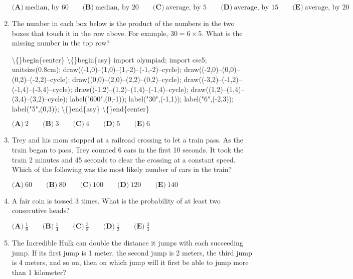 \documentclass{article}
\begin{document}
\begin{enumerate}[label=\arabic*., itemsep=0.5em]
\(\textbf{(A)}\ \text{median, by 60} \qquad \textbf{(B)}\ \text{median, by 20} \qquad \textbf{(C)}\ \text{average, by 5} \qquad \textbf{(D)}\ \text{average, by 15} \qquad \textbf{(E)}\ \text{average, by 20}\)\par \vspace{0.5em}\item The number in each box below is the product of the numbers in the two boxes that touch it in the row above. For example, \(30 = 6\times5\). What is the missing number in the top row?


\textbackslash\{\}begin\{center\}
\textbackslash\{\}begin\{asy\}
import olympiad;
import cse5;
unitsize(0.8cm);
draw((-1,0)--(1,0)--(1,-2)--(-1,-2)--cycle);
draw((-2,0)--(0,0)--(0,2)--(-2,2)--cycle);
draw((0,0)--(2,0)--(2,2)--(0,2)--cycle);
draw((-3,2)--(-1,2)--(-1,4)--(-3,4)--cycle);
draw((-1,2)--(1,2)--(1,4)--(-1,4)--cycle);
draw((1,2)--(1,4)--(3,4)--(3,2)--cycle);
label("600",(0,-1));
label("30",(-1,1));
label("6",(-2,3));
label("5",(0,3));
\textbackslash\{\}end\{asy\}
\textbackslash\{\}end\{center\}


\(\textbf{(A)}\ 2 \qquad \textbf{(B)}\ 3 \qquad \textbf{(C)}\ 4 \qquad \textbf{(D)}\ 5 \qquad \textbf{(E)}\ 6\)\par \vspace{0.5em}\item Trey and his mom stopped at a railroad crossing to let a train pass. As the train began to pass, Trey counted 6 cars in the first 10 seconds. It took the train 2 minutes and 45 seconds to clear the crossing at a constant speed. Which of the following was the most likely number of cars in the train?

\(\textbf{(A)}\ 60 \qquad \textbf{(B)}\ 80 \qquad \textbf{(C)}\ 100 \qquad \textbf{(D)}\ 120 \qquad \textbf{(E)}\ 140\)\par \vspace{0.5em}\item A fair coin is tossed 3 times. What is the probability of at least two consecutive heads?

\(\textbf{(A)}\ \frac18 \qquad \textbf{(B)}\ \frac14 \qquad \textbf{(C)}\ \frac38 \qquad \textbf{(D)}\ \frac12 \qquad \textbf{(E)}\ \frac34\)\par \vspace{0.5em}\item The Incredible Hulk can double the distance it jumps with each succeeding jump. If its first jump is 1 meter, the second jump is 2 meters, the third jump is 4 meters, and so on, then on which jump will it first be able to jump more than 1 kilometer?


\end{enumerate}
\end{document}
